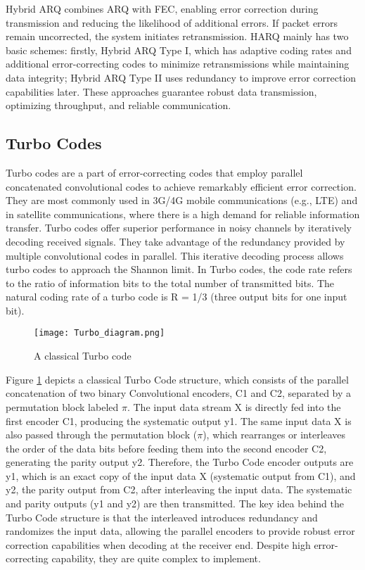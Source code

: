 \documentclass[sn-mathphys-num]{sn-jnl}
\theoremstyle{thmstyleone}
\theoremstyle{thmstyletwo}%
\theoremstyle{thmstylethree}%
\begin{document}
Hybrid ARQ \cite{r1, r50} combines ARQ with FEC, enabling error correction during transmission and reducing the likelihood of additional errors. If packet errors remain uncorrected, the system initiates retransmission. HARQ mainly has two basic schemes: firstly, Hybrid ARQ Type I, which has adaptive coding rates and additional error-correcting codes to minimize retransmissions while maintaining data integrity; Hybrid ARQ Type II uses redundancy to improve error correction capabilities later. These approaches guarantee robust data transmission, optimizing throughput, and reliable communication.
 
\subsection{Turbo Codes}  \label{s1.3}

Turbo codes \cite{r22} are a part of error-correcting codes that employ parallel concatenated convolutional codes to achieve remarkably efficient error correction. They are most commonly used in 3G/4G mobile communications (e.g., LTE) and in satellite communications, where there is a high demand for reliable information transfer. Turbo codes offer superior performance in noisy channels by iteratively decoding received signals. They take advantage of the redundancy provided by multiple convolutional codes in parallel. This iterative decoding process allows turbo codes to approach the Shannon limit. In Turbo codes, the code rate refers to the ratio of information bits to the total number of transmitted bits. The natural coding rate of a turbo code is R = 1/3 (three output bits for one input bit). 

\begin{figure}[H]
    \centering
    \texttt{[image: Turbo\_diagram.png]}
    \caption{A classical Turbo code }
    \label{fig:12}
\end{figure}

Figure \ref{fig:12} \cite{r25} depicts a classical Turbo Code structure, which consists of the parallel concatenation of two binary  Convolutional encoders, C1 and C2, separated by a permutation block labeled $\pi$. The input data stream X is directly fed into the first encoder C1, producing the systematic output y1. The same input data X is also passed through the permutation block ($\pi$), which rearranges or interleaves the order of the data bits before feeding them into the second encoder C2, generating the parity output y2. Therefore, the Turbo Code encoder outputs are y1, which is an exact copy of the input data X (systematic output from C1), and y2, the parity output from C2, after interleaving the input data. The systematic and parity outputs (y1 and y2) are then transmitted. The key idea behind the Turbo Code structure is that the interleaved introduces redundancy and randomizes the input data, allowing the parallel encoders to provide robust error correction capabilities when decoding at the receiver end. Despite high error-correcting capability, they are quite complex to implement.
\end{document}
